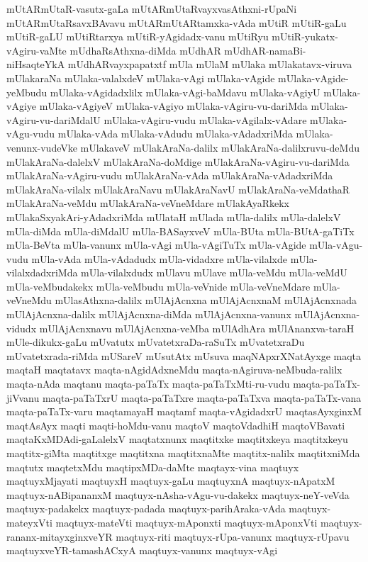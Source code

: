 {mUtARmUtaR-vasutx-gaLa
mUtARmUtaRvayxvasAthxni-rUpaNi
mUtARmUtaRsavxBAvavu
mUtARmUtARtamxka-vAda
mUtiR
mUtiR-gaLu
mUtiR-gaLU
mUtiRtarxya
mUtiR-yAgidadx-vanu
mUtiRyu
mUtiR-yukatx-vAgiru-vaMte
mUdhaRsAthxna-diMda
mUdhAR
mUdhAR-namaBi-niHsaqteYkA
mUdhARvayxpapatxtf
mUla
mUlaM
mUlaka
mUlakatavx-viruva
mUlakaraNa
mUlaka-valalxdeV
mUlaka-vAgi
mUlaka-vAgide
mUlaka-vAgide-yeMbudu
mUlaka-vAgidadxlilx
mUlaka-vAgi-baMdavu
mUlaka-vAgiyU
mUlaka-vAgiye
mUlaka-vAgiyeV
mUlaka-vAgiyo
mUlaka-vAgiru-vu-dariMda
mUlaka-vAgiru-vu-dariMdalU
mUlaka-vAgiru-vudu
mUlaka-vAgilalx-vAdare
mUlaka-vAgu-vudu
mUlaka-vAda
mUlaka-vAdudu
mUlaka-vAdadxriMda
mUlaka-venunx-vudeVke
mUlakaveV
mUlakAraNa-dalilx
mUlakAraNa-dalilxruvu-deMdu
mUlakAraNa-dalelxV
mUlakAraNa-doMdige
mUlakAraNa-vAgiru-vu-dariMda
mUlakAraNa-vAgiru-vudu
mUlakAraNa-vAda
mUlakAraNa-vAdadxriMda
mUlakAraNa-vilalx
mUlakAraNavu
mUlakAraNavU
mUlakAraNa-veMdathaR
mUlakAraNa-veMdu
mUlakAraNa-veVneMdare
mUlakAyaRkekx
mUlakaSxyakAri-yAdadxriMda
mUlataH
mUlada
mUla-dalilx
mUla-dalelxV
mUla-diMda
mUla-diMdalU
mUla-BASayxveV
mUla-BUta
mUla-BUtA-gaTiTx
mUla-BeVta
mUla-vanunx
mUla-vAgi
mUla-vAgiTuTx
mUla-vAgide
mUla-vAgu-vudu
mUla-vAda
mUla-vAdadudx
mUla-vidadxre
mUla-vilalxde
mUla-vilalxdadxriMda
mUla-vilalxdudx
mUlavu
mUlave
mUla-veMdu
mUla-veMdU
mUla-veMbudakekx
mUla-veMbudu
mUla-veVnide
mUla-veVneMdare
mUla-veVneMdu
mUlasAthxna-dalilx
mUlAjAcnxna
mUlAjAcnxnaM
mUlAjAcnxnada
mUlAjAcnxna-dalilx
mUlAjAcnxna-diMda
mUlAjAcnxna-vanunx
mUlAjAcnxna-vidudx
mUlAjAcnxnavu
mUlAjAcnxna-veMba
mUlAdhAra
mUlAnanxva-taraH
mUle-dikukx-gaLu
mUvatutx
mUvatetxraDa-raSuTx
mUvatetxraDu
mUvatetxrada-riMda
mUSareV
mUsutAtx
mUsuva
maqNApxrXNatAyxge
maqta
maqtaH
maqtatavx
maqta-nAgidAdxneMdu
maqta-nAgiruva-neMbuda-ralilx
maqta-nAda
maqtanu
maqta-paTaTx
maqta-paTaTxMti-ru-vudu
maqta-paTaTx-jiVvanu
maqta-paTaTxrU
maqta-paTaTxre
maqta-paTaTxva
maqta-paTaTx-vana
maqta-paTaTx-varu
maqtamayaH
maqtamf
maqta-vAgidadxrU
maqtasAyxginxM
maqtAsAyx
maqti
maqti-hoMdu-vanu
maqtoV
maqtoVdadhiH
maqtoVBavati
maqtaKxMDAdi-gaLalelxV
maqtatxnunx
maqtitxke
maqtitxkeya
maqtitxkeyu
maqtitx-giMta
maqtitxge
maqtitxna
maqtitxnaMte
maqtitx-nalilx
maqtitxniMda
maqtutx
maqtetxMdu
maqtipxMDa-daMte
maqtayx-vina
maqtuyx
maqtuyxMjayati
maqtuyxH
maqtuyx-gaLu
maqtuyxnA
maqtuyx-nApatxM
maqtuyx-nABipananxM
maqtuyx-nAsha-vAgu-vu-dakekx
maqtuyx-neY-veVda
maqtuyx-padakekx
maqtuyx-padada
maqtuyx-parihAraka-vAda
maqtuyx-mateyxVti
maqtuyx-mateVti
maqtuyx-mAponxti
maqtuyx-mAponxVti
maqtuyx-rananx-mitayxginxveYR
maqtuyx-riti
maqtuyx-rUpa-vanunx
maqtuyx-rUpavu
maqtuyxveYR-tamashACxyA
maqtuyx-vanunx
maqtuyx-vAgi
}
